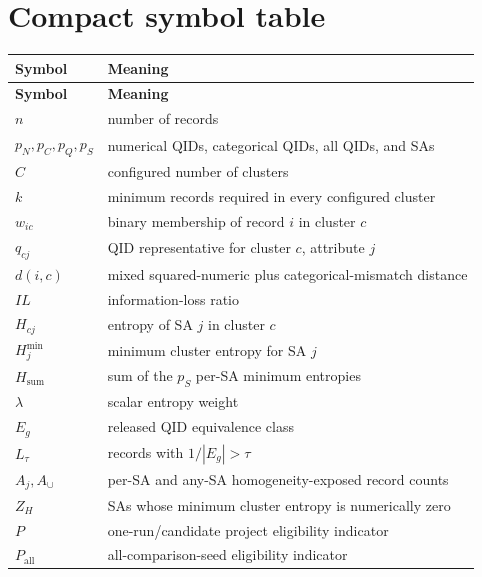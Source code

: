 \documentclass[11pt,a4paper]{article}
\newcommand{\card}[1]{\left\lvert #1\right\rvert}
\begin{document}
\section{Compact symbol table}

\begin{longtable}{@{}L{0.20\textwidth}L{0.73\textwidth}@{}}
\toprule
\textbf{Symbol} & \textbf{Meaning}\\
\midrule
\endfirsthead
\toprule
\textbf{Symbol} & \textbf{Meaning}\\
\midrule
\endhead
$n$ & number of records\\
$p_N,p_C,p_Q,p_S$ & numerical QIDs, categorical QIDs, all QIDs, and SAs\\
$C$ & configured number of clusters\\
$k$ & minimum records required in every configured cluster\\
$w_{ic}$ & binary membership of record $i$ in cluster $c$\\
$q_{cj}$ & QID representative for cluster $c$, attribute $j$\\
$d(i,c)$ & mixed squared-numeric plus categorical-mismatch distance\\
$IL$ & information-loss ratio\\
$H_{cj}$ & entropy of SA $j$ in cluster $c$\\
$H_j^{\min}$ & minimum cluster entropy for SA $j$\\
$H_{\mathrm{sum}}$ & sum of the $p_S$ per-SA minimum entropies\\
$\lambda$ & scalar entropy weight\\
$E_g$ & released QID equivalence class\\
$L_\tau$ & records with $1/\card{E_g}>\tau$\\
$A_j,A_\cup$ & per-SA and any-SA homogeneity-exposed record counts\\
$Z_H$ & SAs whose minimum cluster entropy is numerically zero\\
$P$ & one-run/candidate project eligibility indicator\\
$P_{\mathrm{all}}$ & all-comparison-seed eligibility indicator\\
\bottomrule
\end{longtable}
\end{document}
